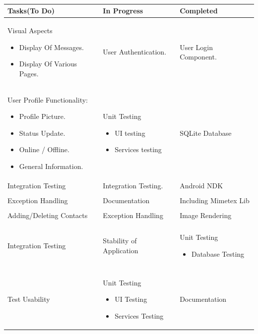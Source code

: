 \documentclass[29pt,a4paper]{moderncv}
\begin{document}
  		\\	\begin{tabular}{| p{7cm} | p{7cm} | p{7cm} |}
				\hline
		    		\textbf{Tasks(To Do)} & \textbf{In Progress} & \textbf{Completed} \\ 
   				\hline
   				\hline
		    		Visual Aspects
		    		\begin{itemize}
			    		\item Display Of Messages.
			    		\item Display Of Various Pages.
		    		\end{itemize}
		    	 	& User Authentication. & User Login Component. \\ 
   				\hline
   				\hline
	   				User Profile Functionality:
	   				\begin{itemize}
	   					\item Profile Picture.
	   					\item Status Update.
	   					\item Online / Offline.
	   					\item General Information.
	   				\end{itemize}	
	   				& Unit Testing
	   				\begin{itemize}
	   					\item UI testing
		   				\item Services testing 
	   				\end {itemize}
	   				& SQLite Database\\
   				
				 Integration Testing & Integration Testing. & Android NDK\\
				
				\\ Exception Handling & Documentation & Including Mimetex Lib\\
				
				\\Adding/Deleting Contacts & Exception Handling & Image Rendering\\
				
				\\Integration Testing & Stability of Application & 
				Unit Testing
				\begin{itemize}
					\item Database Testing
				\end{itemize}
   				\\
   				
   				\\Test Usability &
   				Unit Testing 
   				\begin{itemize}
	   				\item UI Testing
	   				\item Services Testing 
   				\end{itemize} 
   				& Documentation\\
   				

\end{tabular}
\end{document}
